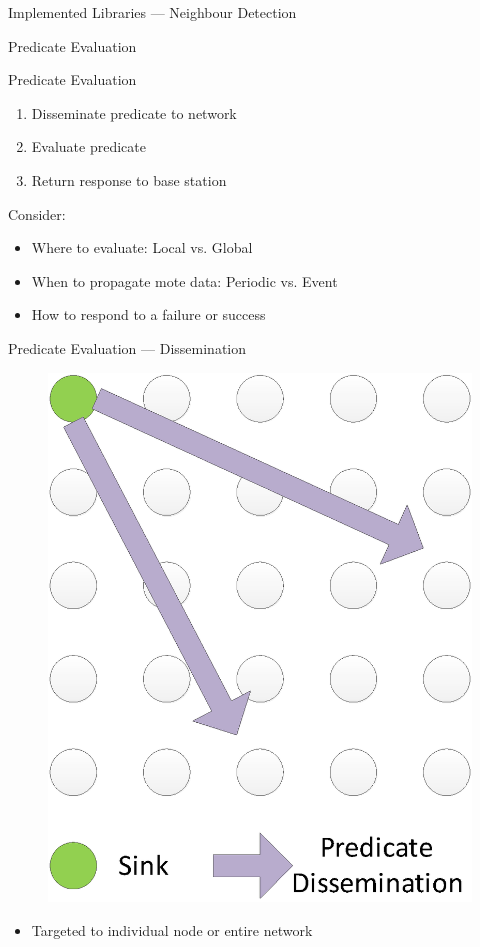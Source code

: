 \documentclass[usenames,dvipsnames]{beamer}
\newcommand{\subtitleframe}[1]{\begin{frame}\begin{block}{\centering\Large \vspace{1em} #1 \vspace{1em}}\end{block}\end{frame}}
\begin{document}
\begin{frame}{Implemented Libraries --- Neighbour Detection}
\begin{figure}[H]
\end{figure}
\end{frame}

\subtitleframe{Predicate Evaluation}

\begin{frame}{Predicate Evaluation}
	\begin{enumerate}
		\item Disseminate predicate to network
		\item Evaluate predicate
		\item Return response to base station
	\end{enumerate}
\vspace{1em}

Consider:
	\begin{itemize}
		\item Where to evaluate: Local vs. Global
		\item When to propagate mote data: Periodic vs. Event
		\item How to respond to a failure or success
	\end{itemize}
\end{frame}

\begin{frame}{Predicate Evaluation --- Dissemination}
\begin{figure}[H]
\includegraphics[scale=0.4]{Diagrams/disseminate-predicate.eps}
\end{figure}
\begin{itemize}
	\item Targeted to individual node or entire network
\end{itemize}
\end{frame}
\end{document}

